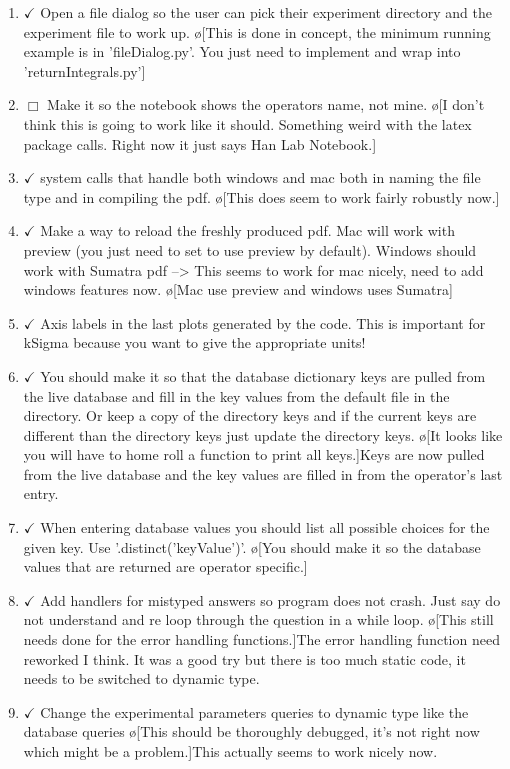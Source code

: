 \documentclass[10pt]{book}
\begin{document}
\begin{enumerate}
    \item $\checkmark$ Open a file dialog so the user can pick their experiment directory and the experiment file to work up. \o[This is done in concept, the minimum running example is in 'fileDialog.py'. You just need to implement and wrap into 'returnIntegrals.py']{}
    \item $\Box$ Make it so the notebook shows the operators name, not mine. \o[I don't think this is going to work like it should. Something weird with the latex package calls. Right now it just says Han Lab Notebook.]{}
    \item $\checkmark$ system calls that handle both windows and mac both in naming the file type and in compiling the pdf. \o[This does seem to work fairly robustly now.]{}
    \item $\checkmark$ Make a way to reload the freshly produced pdf. Mac will work with preview (you just need to set to use preview by default). Windows should work with Sumatra pdf --> This seems to work for mac nicely, need to add windows features now. \o[Mac use preview and windows uses Sumatra]{}
    \item $\checkmark$ Axis labels in the last plots generated by the code. This is important for kSigma because you want to give the appropriate units!
    \item $\checkmark$ You should make it so that the database dictionary keys are pulled from the live database and fill in the key values from the default file in the directory. Or keep a copy of the directory keys and if the current keys are different than the directory keys just update the directory keys. \o[It looks like you will have to home roll a function to print all keys.]{Keys are now pulled from the live database and the key values are filled in from the operator's last entry.}
    \item $\checkmark$ When entering database values you should list all possible choices for the given key. Use '.distinct('keyValue')'. \o[You should make it so the database values that are returned are operator specific.]{}
    \item $\checkmark$ Add handlers for mistyped answers so program does not crash. Just say do not understand and re loop through the question in a while loop. \o[This still needs done for the error handling functions.]{The error handling function need reworked I think. It was a good try but there is too much static code, it needs to be switched to dynamic type.}
    \item $\checkmark$ Change the experimental parameters queries to dynamic type like the database queries \o[This should be thoroughly debugged, it's not right now which might be a problem.]{This actually seems to work nicely now.}

\end{enumerate}
\end{document}
